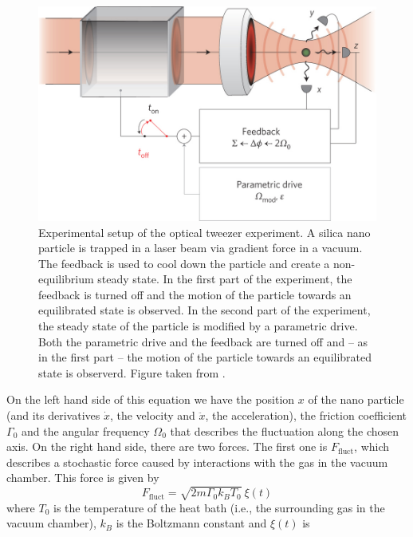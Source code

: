 \documentclass[12pt]{article}
\begin{document}
\begin{figure}[H]
    \begin{center}
        \includegraphics[scale=0.3]{images/experimental_setup.jpg}
        \caption{Experimental setup of the optical tweezer experiment. A silica nano particle is trapped in a laser beam via gradient force in a
        vacuum. The feedback is used to cool down the particle and create a non-equilibrium steady state. In the first part of the experiment, the
    feedback is turned off and the motion of the particle towards an equilibrated state is observed. In the second part of the experiment, the steady state
of the particle is modified by a parametric drive. Both the parametric drive and the feedback are turned off and -- as in the first part -- the
motion of the particle towards an equilibrated state is observerd. Figure taken from \cite{Gieseler2014}.}
        \label{fig:setup}
    \end{center}
\end{figure}
On the left hand side of this equation we have the position $x$ of the nano particle (and its derivatives $\dot{x}$, the velocity and $\ddot{x}$, 
the acceleration), the friction coefficient $\Gamma_0$ and the angular frequency $\Omega_0$ that describes the fluctuation along the chosen axis. On
the right hand side, there are two forces. The first one is $F_\text{fluct}$, which describes a stochastic force caused by interactions with the gas
in the vacuum chamber. This force is given by
\begin{equation}
    \label{eq:ffluct}
    F_\text{fluct} = \sqrt{2m\Gamma_0k_BT_0} \ \xi\left(t\right)
\end{equation}
where $T_0$ is the temperature of the heat bath (i.e., the surrounding gas in the vacuum chamber), $k_B$ is the Boltzmann constant and $\xi(t)$ is
\end{document}
